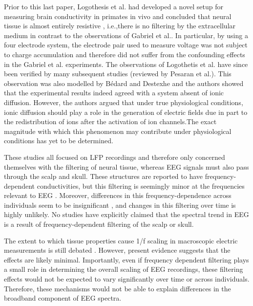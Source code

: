 Prior to this last paper, Logothesis et al.\cite{Logothetis2007} had developed a novel setup for measuring brain conductivity in primates in vivo and concluded that neural tissue is almost entirely resistive , i.e.,there is no filtering by the extracellular medium in contrast to the observations of Gabriel et al.\cite{Gabriel1996}. In particular, by using a four electrode system, the electrode pair used to measure voltage was not subject to charge accumulation and therefore did not suffer from the confounding effects in the Gabriel et al. experiments. The observations of Logothetis et al. have since been verified by many subsequent studies (reviewed by Pesaran et al.\cite{Pesaran2018}). This observation was also modelled by Bédard and Destexhe\cite{Bedard2006a} and the authors showed that the experimental results indeed agreed with a system absent of ionic diffusion. However, the authors argued that under true physiological conditions, ionic diffusion should play a role in the generation of electric fields due in part to the redistribution of ions after the activation of ion channels.The exact magnitude with which this phenomenon may contribute under physiological conditions has yet to be determined.

These studies all focused on LFP recordings and therefore only concerned themselves with the filtering of neural tissue, whereas EEG signals must also pass through the scalp and skull. These structures are reported to have frequency-dependent conductivities, but this filtering is seemingly minor at the frequencies relevant to EEG \cite{Pfurtscheller1975, Akhtari2002, Pesaran2018}. Moreover, differences in this frequency-dependence across individuals seem to be insignificant \cite{Akhtari2002}, and changes in this filtering over time is highly unlikely. No studies have explicitly claimed that the spectral trend in EEG is a result of frequency-dependent filtering of the scalp or skull.

The extent to which tissue properties cause 1/f scaling in macroscopic electric measurements is still debated \cite{Bedard2017}. However, present evidence suggests that the effects are likely minimal. Importantly, even if frequency dependent filtering plays a small role in determining the overall scaling of EEG recordings, these filtering effects would not be expected to vary significantly over time or across individuals. Therefore, these mechanisms would not be able to explain differences in the broadband component of EEG spectra. 


